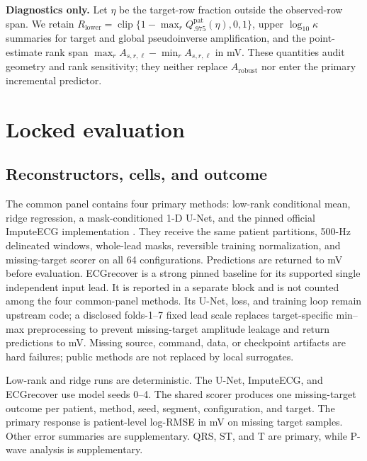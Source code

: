 \documentclass{article}
\begin{document}
\noindent\textbf{Diagnostics only.}  Let $\eta$ be the target-row fraction outside the observed-row
span.  We retain
$R_{\mathrm{lower}}=\operatorname{clip}\{1-\max_rQ^{\mathrm{pat}}_{.975}(\eta),0,1\}$,
upper $\log_{10}\kappa$ summaries for target and global pseudoinverse amplification, and the
point-estimate rank span $\max_r A_{s,r,\ell}-\min_r A_{s,r,\ell}$ in mV.  These quantities audit
geometry and rank sensitivity; they neither replace $A_{\mathrm{robust}}$ nor enter the primary
incremental predictor.

\section{Locked evaluation}
\label{sec:evaluation}
\subsection{Reconstructors, cells, and outcome}
The common panel contains four primary methods: low-rank conditional mean, ridge regression, a
mask-conditioned 1-D U-Net, and the pinned official ImputeECG implementation
\cite{fang2026imputeecg}.  They receive the same patient partitions, 500-Hz delineated windows,
whole-lead masks, reversible training normalization, and missing-target scorer on all 64
configurations.  Predictions are returned to mV before evaluation.
ECGrecover \cite{lence2025ecgrecover} is a strong pinned baseline for its supported single
independent input lead.  It is reported in a separate block and is not counted among the four
common-panel methods.  Its U-Net, loss, and training loop remain upstream code; a disclosed
folds-1--7 fixed lead scale replaces target-specific min--max preprocessing to prevent missing-target
amplitude leakage and return predictions to mV.  Missing source, command, data, or checkpoint artifacts are hard failures;
public methods are not replaced by local surrogates.

Low-rank and ridge runs are deterministic.  The U-Net, ImputeECG, and ECGrecover use model seeds
0--4.  The shared scorer produces one missing-target outcome per patient, method, seed, segment,
configuration, and target.  The primary response is patient-level log-RMSE in mV on missing target
samples.  Other error summaries are supplementary.  QRS, ST, and T are primary, while P-wave
analysis is supplementary.
\end{document}
